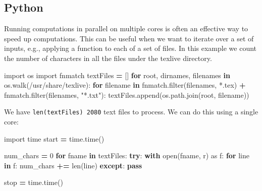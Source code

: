 \documentclass[
]{book}
\newenvironment{Shaded}{\begin{snugshade}}{\end{snugshade}}
\newcommand{\BuiltInTok}[1]{#1}
\newcommand{\ControlFlowTok}[1]{\textcolor[rgb]{0.13,0.29,0.53}{\textbf{#1}}}
\newcommand{\DecValTok}[1]{\textcolor[rgb]{0.00,0.00,0.81}{#1}}
\newcommand{\ImportTok}[1]{#1}
\newcommand{\KeywordTok}[1]{\textcolor[rgb]{0.13,0.29,0.53}{\textbf{#1}}}
\newcommand{\NormalTok}[1]{#1}
\newcommand{\OperatorTok}[1]{\textcolor[rgb]{0.81,0.36,0.00}{\textbf{#1}}}
\newcommand{\StringTok}[1]{\textcolor[rgb]{0.31,0.60,0.02}{#1}}
\begin{document}
\hypertarget{python}{%
\subsection{Python}\label{python}}

Running computations in parallel on multiple cores is often an effective
way to speed up computations. This can be useful when we want to iterate
over a set of inputs, e.g., applying a function to each of a set of
files. In this example we count the number of characters in all the
files under the texlive directory.

\begin{Shaded}
\begin{Highlighting}[]
\ImportTok{import}\NormalTok{ os}
\ImportTok{import}\NormalTok{ fnmatch}
\NormalTok{textFiles }\OperatorTok{=}\NormalTok{ []}
\ControlFlowTok{for}\NormalTok{ root, dirnames, filenames }\KeywordTok{in}\NormalTok{ os.walk(}\StringTok{\textquotesingle{}/usr/share/texlive\textquotesingle{}}\NormalTok{):}
    \ControlFlowTok{for}\NormalTok{ filename }\KeywordTok{in}\NormalTok{ fnmatch.}\BuiltInTok{filter}\NormalTok{(filenames, }\StringTok{\textquotesingle{}*.tex\textquotesingle{}}\NormalTok{) }\OperatorTok{+}\NormalTok{ fnmatch.}\BuiltInTok{filter}\NormalTok{(filenames, }\StringTok{"*.txt"}\NormalTok{):}
\NormalTok{        textFiles.append(os.path.join(root, filename))}
\end{Highlighting}
\end{Shaded}

We have \texttt{len(textFiles)\ 2080} text files to process. We can do this using a
single core:

\begin{Shaded}
\begin{Highlighting}[]
\ImportTok{import}\NormalTok{ time}
\NormalTok{start }\OperatorTok{=}\NormalTok{ time.time()}

\NormalTok{num\_chars }\OperatorTok{=} \DecValTok{0}
\ControlFlowTok{for}\NormalTok{ fname }\KeywordTok{in}\NormalTok{ textFiles:}
    \ControlFlowTok{try}\NormalTok{:}
        \ControlFlowTok{with} \BuiltInTok{open}\NormalTok{(fname, }\StringTok{\textquotesingle{}r\textquotesingle{}}\NormalTok{) }\ImportTok{as}\NormalTok{ f:}
            \ControlFlowTok{for}\NormalTok{ line }\KeywordTok{in}\NormalTok{ f:}
\NormalTok{                num\_chars }\OperatorTok{+=} \BuiltInTok{len}\NormalTok{(line)}
    \ControlFlowTok{except}\NormalTok{:}
        \ControlFlowTok{pass}

\NormalTok{stop }\OperatorTok{=}\NormalTok{ time.time()}
\end{Highlighting}
\end{Shaded}
\end{document}

